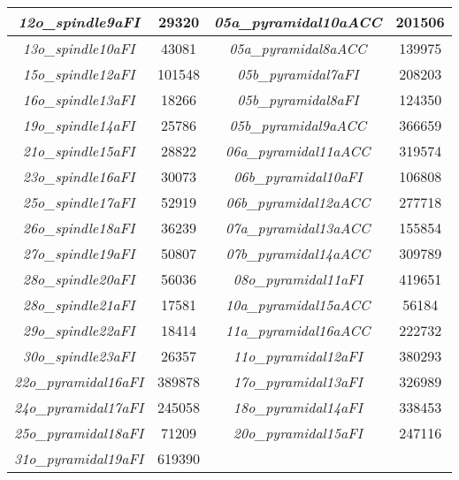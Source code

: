 \begin{tabular}{|c|c|c|c|}
    \textit{12o\_spindle9aFI}    & 29320                & \textit{05a\_pyramidal10aACC} & 201506               \\ \hline
    \textit{13o\_spindle10aFI}   & 43081                & \textit{05a\_pyramidal8aACC}  & 139975               \\ \hline
    \textit{15o\_spindle12aFI}   & 101548               & \textit{05b\_pyramidal7aFI}   & 208203               \\ \hline
    \textit{16o\_spindle13aFI}   & 18266                & \textit{05b\_pyramidal8aFI}   & 124350               \\ \hline
    \textit{19o\_spindle14aFI}   & 25786                & \textit{05b\_pyramidal9aACC}  & 366659               \\ \hline
    \textit{21o\_spindle15aFI}   & 28822                & \textit{06a\_pyramidal11aACC} & 319574               \\ \hline
    \textit{23o\_spindle16aFI}   & 30073                & \textit{06b\_pyramidal10aFI}  & 106808               \\ \hline
    \textit{25o\_spindle17aFI}   & 52919                & \textit{06b\_pyramidal12aACC} & 277718               \\ \hline
    \textit{26o\_spindle18aFI}   & 36239                & \textit{07a\_pyramidal13aACC} & 155854               \\ \hline
    \textit{27o\_spindle19aFI}   & 50807                & \textit{07b\_pyramidal14aACC} & 309789               \\ \hline
    \textit{28o\_spindle20aFI}   & 56036                & \textit{08o\_pyramidal11aFI}  & 419651               \\ \hline
    \textit{28o\_spindle21aFI}   & 17581                & \textit{10a\_pyramidal15aACC} & 56184                \\ \hline
    \textit{29o\_spindle22aFI}   & 18414                & \textit{11a\_pyramidal16aACC} & 222732               \\ \hline
    \textit{30o\_spindle23aFI}   & 26357                & \textit{11o\_pyramidal12aFI}  & 380293               \\ \hline
    \textit{22o\_pyramidal16aFI} & 389878               & \textit{17o\_pyramidal13aFI}  & 326989               \\ \hline
    \textit{24o\_pyramidal17aFI} & 245058               & \textit{18o\_pyramidal14aFI}  & 338453               \\ \hline
    \textit{25o\_pyramidal18aFI} & 71209                & \textit{20o\_pyramidal15aFI}  & 247116               \\ \hline
    \textit{31o\_pyramidal19aFI} & 619390               &                               &                      \\ \hline
\end{tabular}
